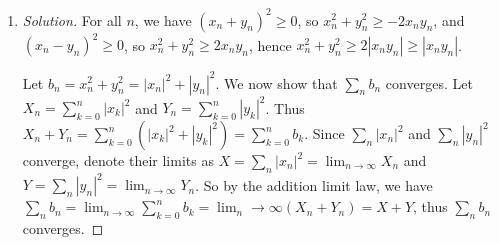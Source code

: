 \documentclass{article}
\begin{document}
\begin{enumerate}
	\item \begin{proof}[Solution]\let\qed\relax
		For all $n$, we have $(x_n + y_n)^2 \geq 0$,
		so $x_n^2 + y_n^2 \geq -2x_ny_n$,
		and $(x_n - y_n)^2 \geq 0$,
		so $x_n^2 + y_n^2 \geq 2x_ny_n$,
		hence $x_n^2 + y_n^2 \geq 2|x_ny_n| \geq |x_ny_n|$.

		Let $b_n = x_n^2 + y_n^2 = |x_n|^2 + |y_n|^2$.
		We now show that $\sum_n b_n$ converges.
		Let $X_n = \sum_{k=0}^n |x_k|^2$ and
		$Y_n = \sum_{k=0}^n|y_k|^2$.
		Thus $X_n + Y_n = \sum_{k=0}^n (|x_k|^2 + |y_k|^2) = \sum_{k=0}^n b_k$.
		Since $\sum_n |x_n|^2$ and $\sum_n |y_n|^2$ converge,
		denote their limits as
		$X = \sum_n|x_n|^2 = \lim_{n\to\infty}X_n$
		and $Y = \sum_n|y_n|^2 = \lim_{n\to\infty}Y_n$.
		So by the addition limit law, we have
		$\sum_n b_n = \lim_{n\to\infty} \sum_{k=0}^n b_k
		= \lim_n\to\infty(X_n + Y_n) = X + Y$,
		thus $\sum_n b_n$ converges.


\end{proof}
\end{enumerate}
\end{document}
